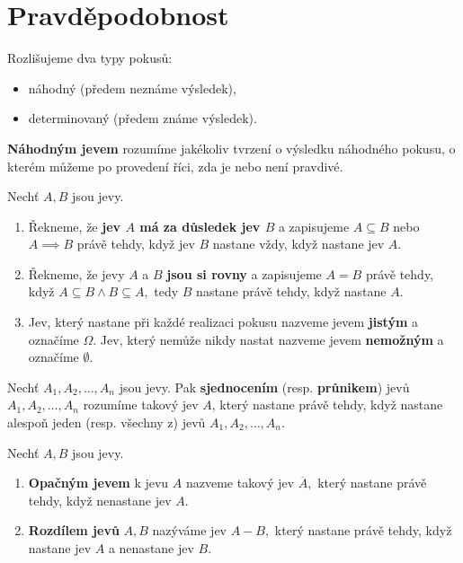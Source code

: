 \section{Pravděpodobnost}
\begin{pozn}
    Rozlišujeme dva typy pokusů:
   	\begin{itemize}
    \item náhodný (předem neznáme výsledek),
   	\item determinovaný (předem známe výsledek).
    \end{itemize}
\end{pozn}

\begin{definition}
    \textbf{Náhodným jevem} rozumíme jakékoliv tvrzení o výsledku náhodného pokusu,
    o kterém můžeme po provedení říci, zda je nebo není pravdivé.
\end{definition}

\begin{definition}
    Nechť $A,B$ jsou jevy.
    \begin{enumerate}[$i.$]
    \item Řekneme, že \textbf{jev $A$ má za důsledek jev $B$} a zapisujeme
    $A\subseteq B$ nebo $A\implies B$ právě tehdy, když jev $B$ nastane vždy, když
    nastane jev $A.$
   	\item Řekneme, že jevy $A$ a $B$ \textbf{jsou si rovny} a zapisujeme $A=B$ právě
    tehdy, když $A\subseteq B \land B\subseteq A,$ tedy $B$ nastane právě tehdy,
    když nastane $A.$
   	\item Jev, který nastane při každé realizaci pokusu nazveme jevem \textbf{jistým}
    a označíme $\Omega.$ Jev, který nemůže nikdy nastat nazveme jevem \textbf{nemožným}
    a označíme $\emptyset.$
    \end{enumerate}
\end{definition}

\begin{definition}
    Nechť $A_1, A_2, \dots, A_n$ jsou jevy. Pak \textbf{sjednocením} (resp. \textbf{průnikem})
    jevů $A_1, A_2, \dots, A_n$ rozumíme takový jev $A$, který nastane
    právě tehdy, když nastane alespoň jeden (resp. všechny z) jevů $A_1, A_2,
    \dots, A_n$.
\end{definition}

\begin{definition}
    Nechť $A,B$ jsou jevy.
    \begin{enumerate}[$i.$]
    \item \textbf{Opačným jevem} k jevu $A$ nazveme takový jev $\overline A,$ který
    nastane právě tehdy, když nenastane jev $A.$
   	\item \textbf{Rozdílem jevů} $A,B$ nazýváme jev $A-B,$ který nastane právě tehdy,
    když nastane jev $A$ a nenastane jev $B$.
    \end{enumerate}
\end{definition}

